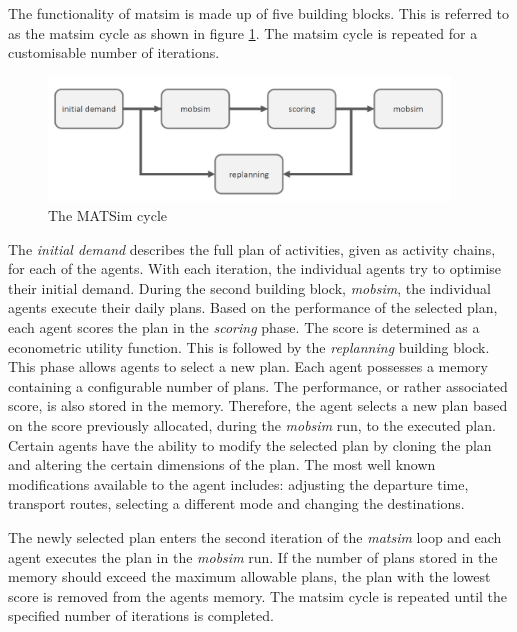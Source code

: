The functionality of \acrshort{matsim} is made up of five building blocks. This is referred to as the \acrshort{matsim} cycle as shown in figure \ref{fig:matsim_loop}. The \acrshort{matsim} cycle is repeated for a customisable number of iterations. 

\begin{figure}[h]
    \centering
    \includegraphics[width=0.95\textwidth]{images/matsim_loop.PNG}
    \caption{The MATSim cycle}
    \label{fig:matsim_loop}
\end{figure}


The \textit{initial demand} describes the full plan of activities, given as activity chains, for each of the agents. With each iteration, the individual agents try to optimise their initial demand. During the second building block, \textit{mobsim}, the individual agents execute their daily plans. Based on the performance of the selected plan, each agent scores the plan in the \textit{scoring} phase. The score is determined as a econometric utility function. This is followed by the \textit{replanning} building block. This phase allows agents to select a new plan. Each agent possesses a memory containing a configurable number of plans. The performance, or rather associated score, is also stored in the memory. Therefore, the agent selects a new plan based on the score previously allocated, during the \textit{mobsim} run, to the executed plan. Certain agents have the ability to modify the selected plan by cloning the plan and altering the certain dimensions of the plan. The most well known modifications available to the agent includes: adjusting the departure time, transport routes, selecting a different mode and changing the destinations.\par

The newly selected plan enters the second iteration of the \textit{matsim} loop and each agent executes the plan in the \textit{mobsim} run. If the number of plans stored in the memory should exceed the maximum allowable plans, the plan with the lowest score is removed from the agents memory. The \acrshort{matsim} cycle is repeated until the specified number of iterations is completed.  \par 

